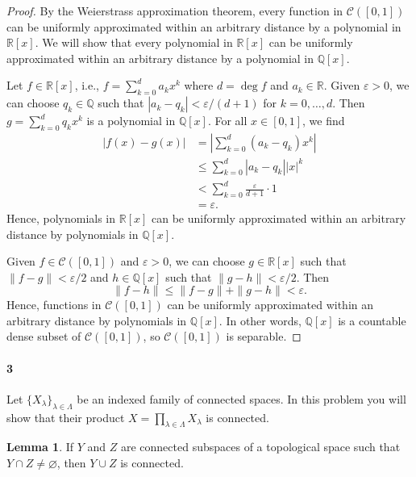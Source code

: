\documentclass[12pt]{article}
\newlength{\myparskip}
\newenvironment{fullbox}{\begin{lrbox}{\savefullbox}\begin{minipage}{\dimexpr\textwidth-2\fboxsep\relax}\setlength{\parskip}{\myparskip}}{\end{minipage}\end{lrbox}\framebox[\textwidth]{\usebox{\savefullbox}}}
\newenvironment{pbox}[1][]{\begin{fullbox}\ifx#1\empty\else\paragraph{#1}\fi}{\end{fullbox}}
\newcommand{\Q}{\mathbb{Q}}
\newcommand{\R}{\mathbb{R}}
\newcommand{\eps}{\varepsilon}
\renewcommand{\emptyset}{\varnothing}
\newcommand{\<}{\langle}
\renewcommand{\>}{\rangle}
\theoremstyle{definition}
\newtheorem{lemma}{Lemma}
\begin{document}
\begin{proof}
    By the Weierstrass approximation theorem, every function in $\mathcal{C}([0, 1])$ can be uniformly approximated within an arbitrary distance by a polynomial in $\R[x]$.
    We will show that every polynomial in $\R[x]$ can be uniformly approximated within an arbitrary distance by a polynomial in $\Q[x]$.

    Let $f \in \R[x]$, i.e., $f = \sum_{k=0}^{d} a_kx^k$ where $d = \deg f$ and $a_k \in \R$.
    Given $\eps > 0$, we can choose $q_k \in \Q$ such that $|a_k - q_k| < \eps/(d+1)$ for $k = 0, \ldots, d$.
    Then $g = \sum_{k=0}^{d} q_kx^k$ is a polynomial in $\Q[x]$.
    For all $x \in [0, 1]$, we find
    \begin{align*}
        |f(x) - g(x)|
            &= \left|\sum_{k=0}^{d} (a_k - q_k)x^k\right| \\
            &\leq \sum_{k=0}^{d} |a_k - q_k||x|^k \\
            &< \sum_{k=0}^{d} \frac{\eps}{d+1} \cdot 1 \\
            &= \eps.
    \end{align*}
    Hence, polynomials in $\R[x]$ can be uniformly approximated within an arbitrary distance by polynomials in $\Q[x]$. 

    Given $f \in \mathcal{C}([0, 1])$ and $\eps > 0$, we can choose $g \in \R[x]$ such that $\|f - g\| < \eps/2$ and $h \in \Q[x]$ such that $\|g - h\| < \eps/2$.
    Then
    \[
        \|f - h\| \leq \|f - g\| + \|g - h\| < \eps.
    \]
    Hence, functions in $\mathcal{C}([0, 1])$ can be uniformly approximated within an arbitrary distance by polynomials in $\Q[x]$. In other words, $\Q[x]$ is a countable dense subset of $\mathcal{C}([0, 1])$, so $\mathcal{C}([0, 1])$ is separable.
\end{proof}


\newpage
\begin{pbox}[3]
    Let $\{X_\lambda\}_{\lambda \in \Lambda}$ be an indexed family of connected spaces.  In this problem you will show that their product $X=\prod_{\lambda \in \Lambda} X_\lambda$ is connected.
\end{pbox}

\begin{lemma}
    If $Y$ and $Z$ are connected subspaces of a topological space such that $Y \cap Z \ne \emptyset$, then $Y \cup Z$ is connected.
\end{lemma}
\end{document}
